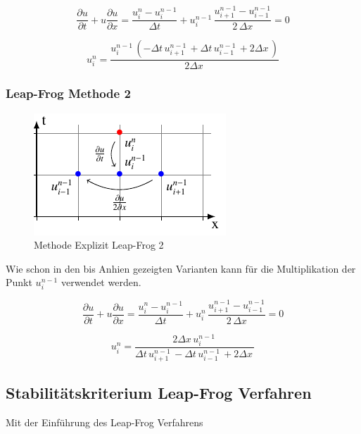 	\begin{equation}
		\frac {\partial u}{\partial t}+u{\frac {\partial u}{\partial x}} = \frac{u_{i}^{n}-u_{i}^{n-1}}{\Delta t}+ u_{i}^{n-1}\, \frac{u_{i+1}^{n-1}-u_{i-1}^{n-1}}{2\,\Delta x}=0
		\label{burgers:eq_ex_lf1}
	\end{equation}

	\begin{equation}
	 u_{i}^{n} = \frac{u^{n-1}_{i}\, \left(- \Delta{t}\, u^{n-1}_{i+1}\, + \Delta{t}\, u^{n-1}_{i-1}\, + 2 \Delta{x}\,\right)}{2 \Delta{x}\,}
		\label{burgers:eq_ex_sol_lf1}
	\end{equation}

\subsubsection{Leap-Frog Methode 2}
     \begin{figure}[!ht]
	\centering
	\includegraphics[height=.4\textwidth]{papers/burgers/BurgersEquation/tikz/Linear4/Linear4.pdf}
	\caption{Methode Explizit  Leap-Frog 2}
	\label{burgers:fig:Linear4}
	\end{figure}

	Wie schon in den bis Anhien gezeigten Varianten kann f\"ur die Multiplikation der Punkt $u_{i}^{n-1}$ verwendet werden.

	\begin{equation}
	\frac {\partial u}{\partial t}+u{\frac {\partial u}{\partial x}} = \frac{u_{i}^{n}-u_{i}^{n-1}}{\Delta t}+ u_{i}^{n}\, \frac{u_{i+1}^{n-1}-u_{i-1}^{n-1}}{2\,\Delta x}=0
	\end{equation}
	
	\begin{equation}
	u_{i}^{n} = \frac{2 \Delta{x}\, u^{n-1}_{i}\,}{\Delta{t}\, u^{n-1}_{i+1}\, - \Delta{t}\, u^{n-1}_{i-1}\, + 2 \Delta{x}\,}
	\end{equation}

\subsection{Stabilit\"atskriterium Leap-Frog Verfahren}
	Mit der Einf\"uhrung des Leap-Frog Verfahrens 









